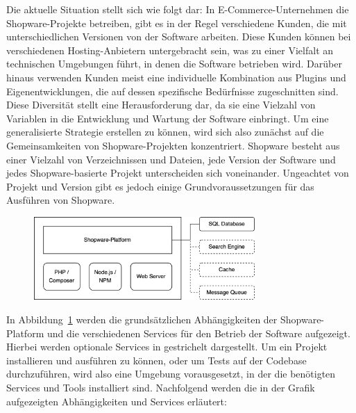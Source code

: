 Die aktuelle Situation stellt sich wie folgt dar: In E-Commerce-Unternehmen die Shopware-Projekte betreiben, gibt es in
der Regel verschiedene Kunden, die mit unterschiedlichen Versionen von der Software arbeiten.
Diese Kunden können bei verschiedenen Hosting-Anbietern untergebracht sein, was zu einer Vielfalt an technischen
Umgebungen führt, in denen die Software betrieben wird.
Darüber hinaus verwenden Kunden meist eine individuelle Kombination aus Plugins und Eigenentwicklungen, die auf dessen
spezifische Bedürfnisse zugeschnitten sind.
Diese Diversität stellt eine Herausforderung dar, da sie eine Vielzahl von Variablen in die Entwicklung und Wartung der
Software einbringt.
Um eine generalisierte Strategie erstellen zu können, wird sich also zunächst auf die Gemeinsamkeiten von
Shopware-Projekten konzentriert.
Shopware besteht aus einer Vielzahl von Verzeichnissen und Dateien, jede Version der Software und jedes
Shopware-basierte Projekt unterscheiden sich voneinander.
Ungeachtet von Projekt und Version gibt es jedoch einige Grundvoraussetzungen für das Ausführen von Shopware.

\begin{figure}[H]
    \centering
    \includegraphics[width=0.75\textwidth]{images/content/shopware-requirements}
    \label{fig:shopware-requirements}
\end{figure}

In Abbildung\ \ref{fig:shopware-requirements} werden die grundsätzlichen Abhängigkeiten der Shopware-Platform und die
verschiedenen Services für den Betrieb der Software aufgezeigt.
Hierbei werden optionale Services in gestrichelt dargestellt.
Um ein Projekt installieren und ausführen zu können, oder um Tests auf der Codebase durchzuführen, wird also eine
Umgebung vorausgesetzt, in der die benötigten Services und Tools installiert sind.
Nachfolgend werden die in der Grafik aufgezeigten Abhängigkeiten und Services erläutert:

